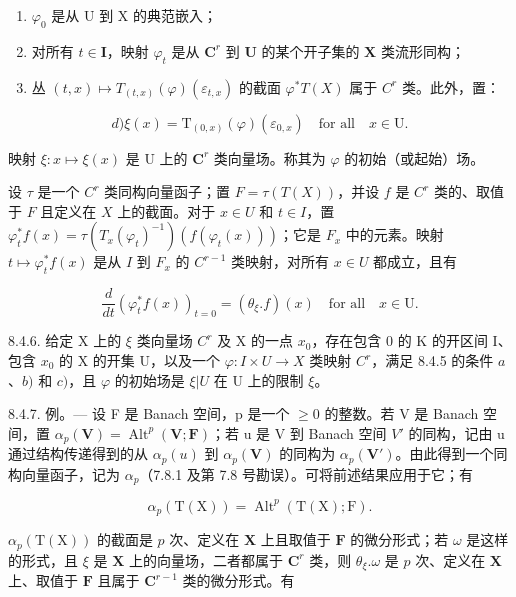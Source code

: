 \begin{enumerate}
\def\labelenumi{\alph{enumi})}
\item
  \(\varphi_{0}\) 是从 U 到 X 的典范嵌入；
\item
  对所有 \(t \in \mathbf{I}\)，映射 \(\varphi_t\) 是从 \(\mathbf{C}^r\) 到 \(\mathbf{U}\) 的某个开子集的 \(\mathbf{X}\) 类流形同构；
\item
  丛 \((t, x) \mapsto T_{(t, x)}(\varphi)(\varepsilon_{t,x})\) 的截面 \(\varphi^*T(X)\) 属于 \(C^r\) 类。此外，置：
\end{enumerate}

\[
d) \xi (x) = \mathrm{T} _ {(0, x)} (\varphi) (\varepsilon_ {0, x}) \quad \text {for all} \quad x \in \mathrm{U}.
\]

映射 \(\xi\colon x\mapsto\xi(x)\) 是 U 上的 \(\mathbf{C}^{r}\) 类向量场。称其为 \(\varphi\) 的初始（或起始）场。

设 \(\tau\) 是一个 \(C^r\) 类同构向量函子；置 \(F = \tau(T(X))\)，并设 \(f\) 是 \(C^r\) 类的、取值于 \(F\) 且定义在 \(X\) 上的截面。对于 \(x \in U\) 和 \(t \in I\)，置 \(\varphi_t^* f(x) = \tau(T_x(\varphi_t)^{-1})(f(\varphi_t(x)))\)；它是 \(F_x\) 中的元素。映射 \(t \mapsto \varphi_t^* f(x)\) 是从 \(I\) 到 \(F_x\) 的 \(C^{r-1}\) 类映射，对所有 \(x \in U\) 都成立，且有

\[
\frac {d}{d t} \left(\varphi_ {t} ^ {*} f (x)\right) _ {t = 0} = \left(\theta_ {\xi}. f\right) (x) \quad \text {for all} \quad x \in \mathrm{U}.\tag{2}
\]

8.4.6. 给定 X 上的 \(\xi\) 类向量场 \(C^r\) 及 X 的一点 \(x_0\)，存在包含 0 的 K 的开区间 I、包含 \(x_0\) 的 X 的开集 U，以及一个 \(\varphi: I \times U \to X\) 类映射 \(C^r\)，满足 8.4.5 的条件 \(a\)、\(b)\) 和 \(c)\)，且 \(\varphi\) 的初始场是 \(\xi|U\) 在 U 上的限制 \(\xi\)。

8.4.7. 例。--- 设 F 是 Banach 空间，p 是一个 \(\geqslant0\) 的整数。若 V 是 Banach 空间，置 \(\alpha_{p}(\mathbf{V}) = \operatorname{Alt}^{p}(\mathbf{V}; \mathbf{F})\)；若 u 是 V 到 Banach 空间 \(V'\) 的同构，记由 u 通过结构传递得到的从 \(\alpha_{p}(u)\) 到 \(\alpha_{p}(\mathbf{V})\) 的同构为 \(\alpha_{p}(\mathbf{V}')\)。由此得到一个同构向量函子，记为 \(\alpha_{p}\)（7.8.1 及第 7.8 号勘误）。可将前述结果应用于它；有

\[
\alpha_ {p} (\mathrm{T} (\mathrm{X})) = \operatorname{Alt}^{p}(\mathrm{T} (\mathrm{X}); \mathrm{F}).
\]

\(\alpha_{p}(\mathrm{T}(\mathrm{X}))\) 的截面是 \(p\) 次、定义在 \(\mathbf{X}\) 上且取值于 \(\mathbf{F}\) 的微分形式；若 \(\omega\) 是这样的形式，且 \(\xi\) 是 \(\mathbf{X}\) 上的向量场，二者都属于 \(\mathbf{C}^{r}\) 类，则 \(\theta_{\xi}.\omega\) 是 \(p\) 次、定义在 \(\mathbf{X}\) 上、取值于 \(\mathbf{F}\) 且属于 \(\mathbf{C}^{r-1}\) 类的微分形式。有

